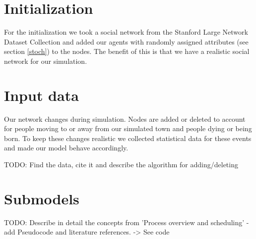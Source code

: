 \documentclass{article}
\begin{document}
	\section{Initialization}
		For the initialization we took a social network from the Stanford Large Network Dataset
		Collection \cite{snapnets} and added our agents with randomly assigned attributes (see
		section \ref{stoch}) to the nodes. The benefit of this is that we have a realistic
		social network for our simulation.

	\section{Input data}
		Our network changes during simulation. Nodes are added or deleted to account for
		people moving to or away from our simulated town and people dying or being born. To keep
		these changes realistic we collected statistical data for these events and made our model
		behave accordingly.
		\\\par
		TODO: Find the data, cite it and describe the algorithm for adding/deleting

	\section{Submodels}
		TODO: Describe in detail the concepts from 'Process overview and scheduling' - add
		Pseudocode and literature references. -> See code

	\medskip

	
	{}
\end{document}
